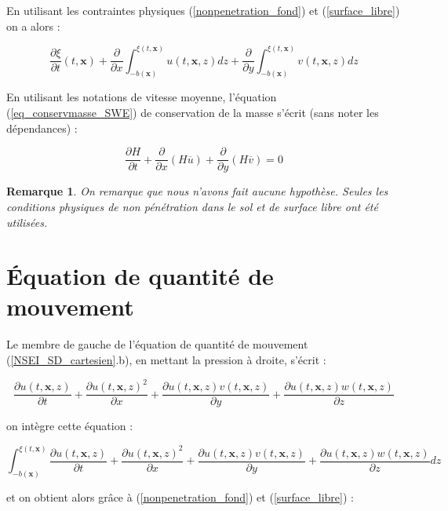 \documentclass[10pt,a4paper]{amsart}
\newtheorem{remarque}{Remarque}
\def\gint{\displaystyle\int}
\begin{document}
En utilisant les contraintes physiques (\ref{nonpenetration_fond}) et (\ref{surface_libre}) on a alors :

\begin{equation}\label{eq_conservmasse_SWE}
\dfrac{\partial \xi}{\partial t}(t,\textbf{x}) + \dfrac{\partial}{\partial x} \gint_{-b(\textbf{x})}^{\xi(t,\textbf{x})} u(t,\textbf{x},z) dz + \dfrac{\partial}{\partial y} \gint_{-b(\textbf{x})}^{\xi(t,\textbf{x})} v(t,\textbf{x},z) dz
\end{equation}

En utilisant les notations de vitesse moyenne, l'équation (\ref{eq_conservmasse_SWE}) de conservation de la masse s'écrit (sans noter les dépendances) :

\begin{equation}\label{eq_SWE1}
\dfrac{\partial H}{\partial t} + \dfrac{\partial}{\partial x} \left( H \overline{u} \right)+ \dfrac{\partial}{\partial y} \left( H \overline{v} \right) = 0
\end{equation}

\begin{remarque}
On remarque que nous n'avons fait aucune hypothèse. Seules les conditions physiques de non pénétration dans le sol et de surface libre ont été utilisées.
\end{remarque}


\section{\'Equation de quantité de mouvement}

Le membre de gauche de l'équation de quantité de mouvement (\ref{NSEI_SD_cartesien}.b), en mettant la pression à droite, s'écrit :

$$\dfrac{\partial u(t, \textbf{x}, z)}{\partial t}  + \dfrac{\partial u(t, \textbf{x}, z)^2}{\partial x} + \dfrac{\partial u(t, \textbf{x}, z) v(t, \textbf{x}, z)}{\partial y} + \dfrac{\partial u(t, \textbf{x}, z) w(t, \textbf{x}, z)}{\partial z} $$

on intègre cette équation :

$$\gint_{-b(\textbf{x})}^{\xi(t, \textbf{x})} \dfrac{\partial u(t, \textbf{x}, z)}{\partial t}  + \dfrac{\partial u(t, \textbf{x}, z)^2}{\partial x} + \dfrac{\partial u(t, \textbf{x}, z) v(t, \textbf{x}, z)}{\partial y} + \dfrac{\partial u(t, \textbf{x}, z) w(t, \textbf{x}, z)}{\partial z}  dz$$

et on obtient alors grâce à (\ref{nonpenetration_fond}) et (\ref{surface_libre}) :
\end{document}
